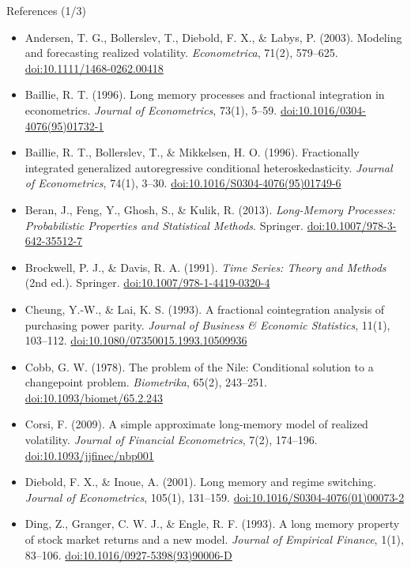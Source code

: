 \begin{frame}{References (1/3)}
\itemsize{\scriptsize}
\begin{itemize}
    \item Andersen, T. G., Bollerslev, T., Diebold, F. X., \& Labys, P. (2003). Modeling and forecasting realized volatility. \textit{Econometrica}, 71(2), 579--625. \href{https://doi.org/10.1111/1468-0262.00418}{doi:10.1111/1468-0262.00418}
    \item Baillie, R. T. (1996). Long memory processes and fractional integration in econometrics. \textit{Journal of Econometrics}, 73(1), 5--59. \href{https://doi.org/10.1016/0304-4076(95)01732-1}{doi:10.1016/0304-4076(95)01732-1}
    \item Baillie, R. T., Bollerslev, T., \& Mikkelsen, H. O. (1996). Fractionally integrated generalized autoregressive conditional heteroskedasticity. \textit{Journal of Econometrics}, 74(1), 3--30. \href{https://doi.org/10.1016/S0304-4076(95)01749-6}{doi:10.1016/S0304-4076(95)01749-6}
    \item Beran, J., Feng, Y., Ghosh, S., \& Kulik, R. (2013). \textit{Long-Memory Processes: Probabilistic Properties and Statistical Methods}. Springer. \href{https://doi.org/10.1007/978-3-642-35512-7}{doi:10.1007/978-3-642-35512-7}
    \item Brockwell, P. J., \& Davis, R. A. (1991). \textit{Time Series: Theory and Methods} (2nd ed.). Springer. \href{https://doi.org/10.1007/978-1-4419-0320-4}{doi:10.1007/978-1-4419-0320-4}
    \item Cheung, Y.-W., \& Lai, K. S. (1993). A fractional cointegration analysis of purchasing power parity. \textit{Journal of Business \& Economic Statistics}, 11(1), 103--112. \href{https://doi.org/10.1080/07350015.1993.10509936}{doi:10.1080/07350015.1993.10509936}
    \item Cobb, G. W. (1978). The problem of the Nile: Conditional solution to a changepoint problem. \textit{Biometrika}, 65(2), 243--251. \href{https://doi.org/10.1093/biomet/65.2.243}{doi:10.1093/biomet/65.2.243}
    \item Corsi, F. (2009). A simple approximate long-memory model of realized volatility. \textit{Journal of Financial Econometrics}, 7(2), 174--196. \href{https://doi.org/10.1093/jjfinec/nbp001}{doi:10.1093/jjfinec/nbp001}
    \item Diebold, F. X., \& Inoue, A. (2001). Long memory and regime switching. \textit{Journal of Econometrics}, 105(1), 131--159. \href{https://doi.org/10.1016/S0304-4076(01)00073-2}{doi:10.1016/S0304-4076(01)00073-2}
    \item Ding, Z., Granger, C. W. J., \& Engle, R. F. (1993). A long memory property of stock market returns and a new model. \textit{Journal of Empirical Finance}, 1(1), 83--106. \href{https://doi.org/10.1016/0927-5398(93)90006-D}{doi:10.1016/0927-5398(93)90006-D}
\end{itemize}
\end{frame}

